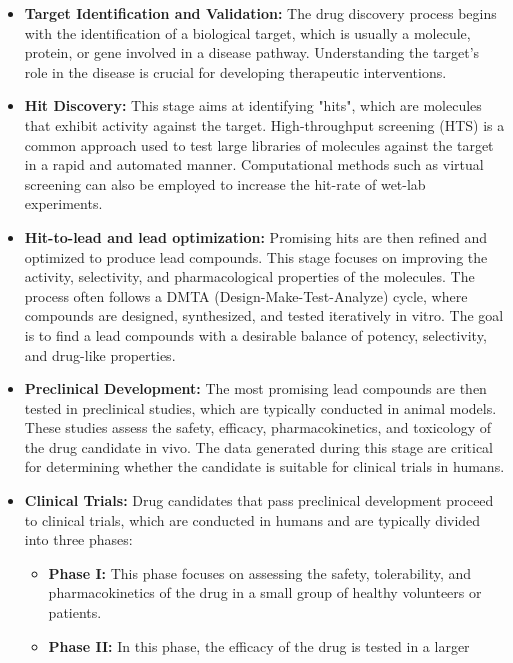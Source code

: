 \begin{itemize}
      \item \textbf{Target Identification and Validation:} The drug discovery process begins with the
            identification of a biological target, which is usually a molecule, protein, or gene involved
            in a disease pathway. Understanding the target's role in the disease is crucial for developing
            therapeutic interventions.
      \item \textbf{Hit Discovery:} This stage aims at identifying "hits", which are molecules that
            exhibit activity against the target. High-throughput screening (HTS) is a common approach
            used to test large libraries of molecules against the target in a rapid and automated manner.
            Computational methods such as virtual screening can also be employed to increase the hit-rate
            of wet-lab experiments.
      \item \textbf{Hit-to-lead and lead optimization:} Promising hits are then refined and optimized to produce lead
            compounds. This stage focuses on improving the activity, selectivity, and pharmacological
            properties of the molecules. The process often follows a DMTA
            (Design-Make-Test-Analyze) cycle, where compounds are designed, synthesized, and tested
            iteratively in vitro. The goal is to find a lead compounds with a desirable balance of potency,
            selectivity, and drug-like properties.
      \item \textbf{Preclinical Development:} The most promising lead compounds are then tested in
            preclinical studies, which are typically conducted in animal models. These studies assess the
            safety, efficacy, pharmacokinetics, and toxicology of the drug candidate in vivo. The data
            generated during this stage are critical for determining whether the candidate is suitable for
            clinical trials in humans.
      \item \textbf{Clinical Trials:} Drug candidates that pass preclinical development proceed to
            clinical trials, which are conducted in humans and are typically divided into three phases:
            \begin{itemize}
                  \item \textbf{Phase I:} This phase focuses on assessing the safety, tolerability, and
                        pharmacokinetics of the drug in a small group of healthy volunteers or patients.
                  \item \textbf{Phase II:} In this phase, the efficacy of the drug is tested in a larger

\end{itemize}
\end{itemize}
